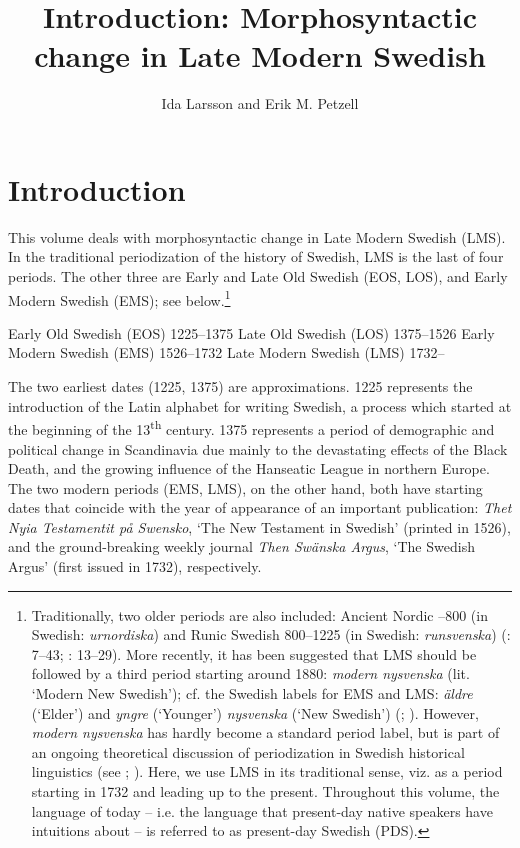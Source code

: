 \documentclass[output=paper]{langscibook}
\author{Ida Larsson\affiliation{Østfold University College, Halden} and Erik M. Petzell\affiliation{Institute for Language and Folklore, Gothenburg}}
\title{Introduction: Morphosyntactic change in Late Modern Swedish}
\begin{document}
\maketitle 



\section{Introduction}\label{sec:intro:1}


This volume deals with morphosyntactic change in Late Modern Swedish (LMS). In the traditional periodization of the history of Swedish, LMS is the last of four periods. The other three are Early and Late Old Swedish (EOS, LOS), and Early Modern Swedish (EMS); see  below.\footnote{Traditionally, two older periods are also included: Ancient Nordic –800 (in Swedish: \textit{urnordiska}) and Runic Swedish 800–1225 (in Swedish: \textit{runsvenska}) (\citealt{Wessen1958}: 7–43; \citealt{Bergman1968}: 13–29). More recently, it has been suggested that LMS should be followed by a third period starting around 1880: \textit{modern nysvenska} (lit. ‘Modern New Swedish’); cf. the Swedish labels for EMS and LMS: \textit{äldre} (‘Elder’) and \textit{yngre} (‘Younger’) \textit{nysvenska} (‘New Swedish’) (\citealt{Thelander1988}; \citealt{Malmgren2007}). However, \textit{modern nysvenska} has hardly become a standard period label, but is part of an ongoing theoretical discussion of periodization in Swedish historical linguistics (see \citealt{Ralph2000}; \citealt{Johansson2007, Johansson2010}). Here, we use LMS in its traditional sense, viz. as a period starting in 1732 and leading up to the present. Throughout this volume, the language of today – i.e. the language that present-day native speakers have intuitions about – is referred to as present-day Swedish (PDS).}


\ea \label{ex:intro:1}
\ea   Early Old Swedish (EOS) 1225–1375
\ex  Late Old Swedish (LOS) 1375–1526
\ex   Early Modern Swedish (EMS) 1526–1732
\ex   Late Modern Swedish (LMS) 1732–
\z
\z

The two earliest dates (1225, 1375) are approximations. 1225 represents the introduction of the Latin alphabet for writing Swedish, a process which started at the beginning of the 13\textsuperscript{th} century. 1375 represents a period of demographic and political change in Scandinavia due mainly to the devastating effects of the Black Death, and the growing influence of the Hanseatic League in northern Europe. The two modern periods (EMS, LMS), on the other hand, both have starting dates that coincide with the year of appearance of an important publication: \textit{Thet Nyia Testamentit på Swensko}, ‘The New Testament in Swedish’ (printed in 1526), and the ground-breaking weekly journal \textit{Then Swänska Argus}, ‘The Swedish Argus’ (first issued in 1732), respectively.
\end{document}
